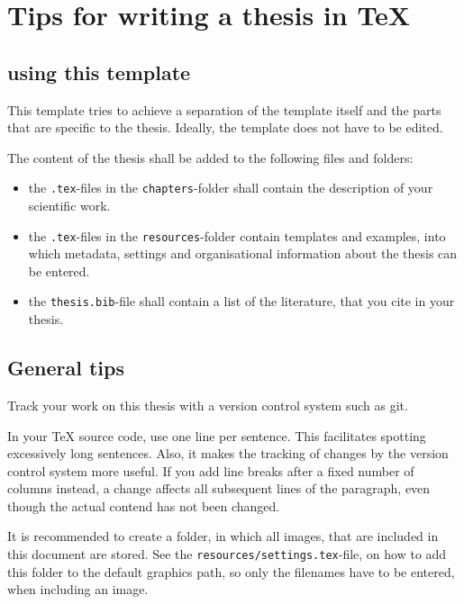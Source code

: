 \chapter{Tips for writing a thesis in TeX}

	\section{using this template}
		This template tries to achieve a separation of the template itself and the parts that are specific to the thesis. Ideally, the template does not have to be edited.

	The content of the thesis shall be added to the following files and folders:
	\begin{itemize}
		\item the \texttt{.tex}-files in the \texttt{chapters}-folder shall contain the description of your scientific work.
		\item the \texttt{.tex}-files in the \texttt{resources}-folder contain templates and examples, into which metadata, settings and organisational information about the thesis can be entered.
		\item the \texttt{thesis.bib}-file shall contain a list of the literature, that you cite in your thesis.
	\end{itemize}

	\section{General tips}
		Track your work on this thesis with a version control system such as git.

		In your TeX source code, use one line per sentence.
		This facilitates spotting excessively long sentences.
		Also, it makes the tracking of changes by the version control system more useful.
		If you add line breaks after a fixed number of columns instead, a change affects all subsequent lines of the paragraph, even though the actual contend has not been changed.

		It is recommended to create a folder, in which all images, that are included in this document are stored.
		See the \texttt{resources/settings.tex}-file, on how to add this folder to the default graphics path, so only the filenames have to be entered, when including an image.
